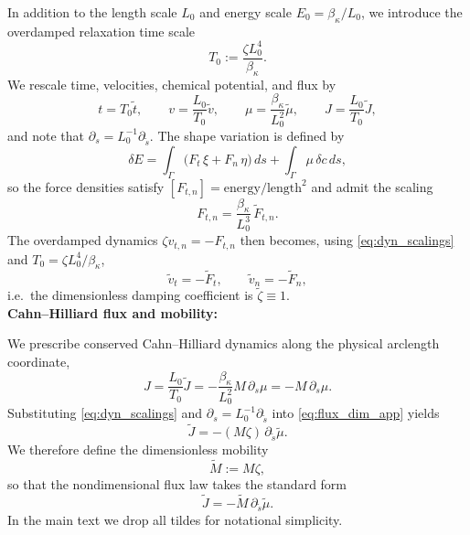 \documentclass[
aip,
jcp,
reprint, 
floatfix
]{revtex4-1}
\begin{document}
In addition to the length scale $L_0$ and energy scale $E_0=\beta_\kappa/L_0$, we introduce the
overdamped relaxation time scale
\begin{equation}
T_0 := \frac{\zeta L_0^4}{\beta_{\kappa}}.
\end{equation}
We rescale time, velocities, chemical potential, and flux by
\begin{equation}
t=T_0\tilde t,\qquad
v=\frac{L_0}{T_0}\tilde v,\qquad
\mu=\frac{\beta_{\kappa}}{L_0^2}\tilde\mu,\qquad
J=\frac{L_0}{T_0}\tilde J,
\label{eq:dyn_scalings}
\end{equation}
and note that $\partial_s = L_0^{-1}\partial_{\tilde s}$. The shape variation is defined by
\begin{equation}
\delta E
=
\int_\Gamma \Big(F_t\,\xi + F_n\,\eta\Big)\,ds
+\int_\Gamma \mu\,\delta c\,ds,
\label{eq:shape_deriv_def_app}
\end{equation}
so the force densities satisfy $[F_{t,n}] = \mathrm{energy}/\mathrm{length}^2$ and admit the scaling
\begin{equation}
F_{t,n}=\frac{\beta_\kappa}{L_0^3}\,\tilde F_{t,n}.
\label{eq:force_scaling}
\end{equation}
The overdamped dynamics $\zeta v_{t,n}=-F_{t,n}$ then becomes, using \eqref{eq:dyn_scalings} and
$T_0=\zeta L_0^4/\beta_\kappa$,
\begin{equation}
\tilde v_t=-\tilde F_t,\qquad
\tilde v_n=-\tilde F_n,
\label{eq:overdamped_nd}
\end{equation}
i.e.\ the dimensionless damping coefficient is $\tilde\zeta\equiv 1$.\\

{\bf Cahn--Hilliard flux and mobility:}

We prescribe conserved Cahn--Hilliard dynamics along the physical arclength coordinate,
\begin{equation}
J
=\frac{L_0}{T_0}\tilde J 
=-\frac{\beta_{\kappa}}{L_0^2} M\,\partial_s\mu
= -M\,\partial_s\mu.
\label{eq:flux_dim_app}
\end{equation}
Substituting \eqref{eq:dyn_scalings} and $\partial_s=L_0^{-1}\partial_{\tilde s}$ into
\eqref{eq:flux_dim_app} yields
\begin{equation}
\tilde J = - (M\zeta)\,\partial_{\tilde s}\tilde\mu.
\end{equation}
We therefore define the dimensionless mobility
\begin{equation}
\tilde M := M\zeta,
\label{eq:mobility_nd}
\end{equation}
so that the nondimensional flux law takes the standard form
\begin{equation}
\tilde J = -\tilde M\,\partial_{\tilde s}\tilde\mu.
\label{eq:flux_nd_app}
\end{equation}
\noindent
In the main text we drop all tildes for notational simplicity. 
\end{document}
